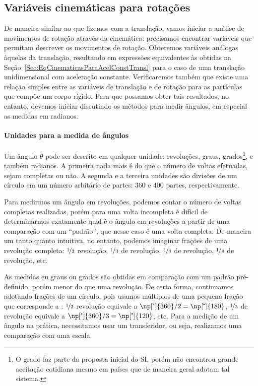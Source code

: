 \subsection{Variáveis cinemáticas para rotações}

De maneira similar ao que fizemos com a translação, vamos iniciar a análise de movimentos de rotação através da cinemática: precisamos encontrar variáveis que permitam descrever os movimentos de rotação. Obteremos variáveis análogas àquelas da translação, resultando em expressões equivalentes às obtidas na Seção~\ref{Sec:EqCinematicasParaAcelConstTransl} para o caso de uma translação unidimensional com aceleração constante. Verificaremos também que existe uma relação simples entre as variáveis de translação e de rotação para as partículas que compõe um corpo rígido. Para que possamos obter tais resultados, no entanto, devemos iniciar discutindo os métodos para medir ângulos, em especial as medidas em radianos. 

\paragraph{Unidades para a medida de ângulos}

Um ângulo $\theta$ pode ser descrito em qualquer unidade: revoluções, graus, grados\footnote{O grado faz parte da proposta inicial do SI, porém não encontrou grande aceitação cotidiana mesmo em países que de maneira geral adotam tal sistema.}, e também radianos. A primeira nada mais é do que o número de voltas efetuadas, sejam completas ou não. A segunda e a terceira unidades são divisões de um círculo em um número arbitário de partes: 360 e 400 partes, respectivamente.

Para medirmos um ângulo em revoluções, podemos contar o número de voltas completas realizadas, porém para uma volta incompleta é difícil de determinarmos exatamente qual é o ângulo em revoluções a partir de uma comparação com um ``padrão'', que nesse caso é uma volta completa. De maneira um tanto quanto intuitiva, no entanto, podemos imaginar frações de uma revolução completa: $\nicefrac{1}{2}$ revolução, $\nicefrac{1}{3}$ de revolução, $\nicefrac{1}{4}$ de revolução, $\nicefrac{1}{8}$ de revolução, etc. 

As medidas eu graus ou grados são obtidas em comparação com um padrão pré-definido, porém menor do que uma revolução. De certa forma, continuamos adotando frações de um círculo, pois usamos múltiplos de uma pequena fração que corresponde a : $\nicefrac{1}{2}$ revolução equivale a $\np[\tcdegree]{360} / 2 = \np[\tcdegree]{180}$, $\nicefrac{1}{3}$ de revolução equivale a $\np[\tcdegree]{360} / 3 = \np[\tcdegree]{120}$, etc. Para a medição de um ângulo na prática, necessitamos usar um transferidor, ou seja, realizamos uma comparação com uma escala.

